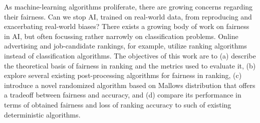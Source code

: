 As machine-learning algorithms proliferate, there are growing concerns regarding their fairness. Can we stop AI, trained on real-world data, from reproducing and exacerbating real-world biases? There exists a growing body of work on fairness in AI, but often focussing rather narrowly on classification problems. Online advertising and job-candidate rankings, for example, utilize ranking algorithms instead of classification algorithms. The objectives of this work are to (a) describe the theoretical basis of fairness in ranking and the metrics used to evaluate it, (b) explore several existing post-processing algorithms for fairness in ranking, (c) introduce a novel randomized algorithm based on Mallows distribution that offers a tradeoff between fairness and accuracy, and (d) compare its performance in terms of obtained fairness and loss of ranking accuracy to such of existing deterministic algorithms. 